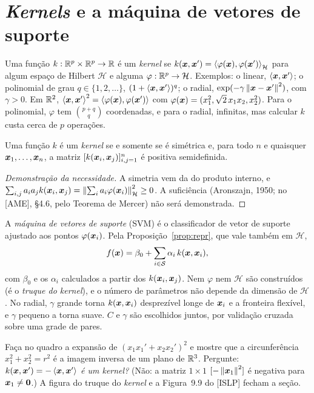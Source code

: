 \documentclass[11pt,a4paper]{article}
\begin{document}
\section{\emph{Kernels} e a máquina de vetores de suporte}
Uma função $k:\mathbb{R}^p\times\mathbb{R}^p\to\mathbb{R}$ é um \emph{kernel} se
$k(\bm{x},\bm{x}')=\left\langle \varphi(\bm{x}), \varphi(\bm{x}') \right\rangle_{\mathcal H}$ para algum espaço de Hilbert
$\mathcal H$ e alguma $\varphi:\mathbb{R}^p\to\mathcal H$. Exemplos: o linear,
$\left\langle \bm{x}, \bm{x}' \right\rangle$; o polinomial de grau $q\in\{1,2,\dots\}$, $(1+\left\langle \bm{x}, \bm{x}' \right\rangle)^q$; o
radial, $\exp(-\gamma\left\lVert \bm{x}-\bm{x}' \right\rVert^2)$, com $\gamma>0$. Em $\mathbb{R}^2$,
$\left\langle \bm{x}, \bm{x}' \right\rangle^2=\left\langle \varphi(\bm{x}), \varphi(\bm{x}') \right\rangle$ com
$\varphi(\bm{x})=(x_1^2,\sqrt2\,x_1x_2,x_2^2)$. Para o polinomial, $\varphi$ tem
$\binom{p+q}{q}$ coordenadas, e para o radial, infinitas, mas calcular $k$ custa cerca
de $p$ operações.

\begin{teorema}\label{teo:kernel}
Uma função $k$ é um \emph{kernel} se e somente se é simétrica e, para todo $n$ e
quaisquer $\bm{x}_1,\dots,\bm{x}_n$, a matriz $[k(\bm{x}_i,\bm{x}_j)]_{i,j=1}^n$ é positiva
semidefinida.
\end{teorema}
\begin{proof}[Demonstração da necessidade]
A simetria vem da do produto interno, e
$\sum_{i,j}a_ia_jk(\bm{x}_i,\bm{x}_j)=\left\lVert \sum_ia_i\varphi(\bm{x}_i) \right\rVert_{\mathcal H}^2\ge0$. A
suficiência (Aronszajn, 1950; no [AME], §4.6, pelo Teorema de Mercer) não será
demonstrada.
\end{proof}

A \emph{máquina de vetores de suporte} (SVM) é o classificador de vetor de suporte
ajustado aos pontos $\varphi(\bm{x}_i)$. Pela Proposição~\ref{prop:repr}, que vale também
em $\mathcal H$,
\begin{equation}\label{eq:svm}
  f(\bm{x})=\beta_0+\sum_{i\in\mathcal S}\alpha_i\,k(\bm{x},\bm{x}_i),
\end{equation}
com $\beta_0$ e os $\alpha_i$ calculados a partir dos $k(\bm{x}_i,\bm{x}_j)$. Nem $\varphi$ nem
$\mathcal H$ são construídos (é o \emph{truque do kernel}), e o número de parâmetros
não depende da dimensão de $\mathcal H$. No radial, $\gamma$ grande torna
$k(\bm{x},\bm{x}_i)$ desprezível longe de $\bm{x}_i$ e a fronteira flexível, e $\gamma$ pequeno a
torna suave. $C$ e $\gamma$ são escolhidos juntos, por validação cruzada sobre uma
grade de pares.

\begin{emsala}
Faça no quadro a expansão de $(x_1x_1'+x_2x_2')^2$ e mostre que a circunferência
$x_1^2+x_2^2=r^2$ é a imagem inversa de um plano de $\mathbb{R}^3$. Pergunte:
\emph{$k(\bm{x},\bm{x}')=-\left\langle \bm{x}, \bm{x}' \right\rangle$ é um kernel?} (Não: a matriz $1\times1$
$[-\left\lVert \bm{x}_1 \right\rVert^2]$ é negativa para $\bm{x}_1\ne\bm 0$.) A figura do truque do
\emph{kernel} e a Figura~9.9 do [ISLP] fecham a seção.
\end{emsala}
\end{document}
